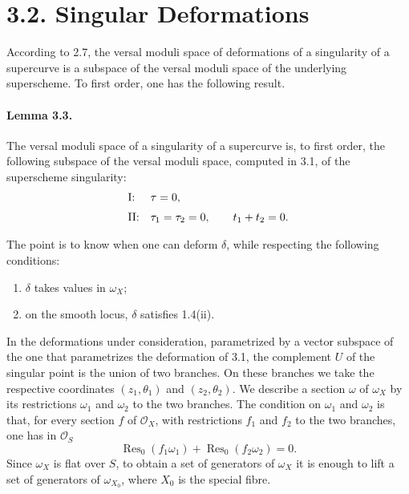 \documentclass[11pt]{article}
\newcommand{\OO}{\mathcal O}
\newcommand{\res}{\operatorname{Res}}
\begin{document}
\section*{3.2. Singular Deformations}

According to 2.7, the versal moduli space of deformations of a singularity of a supercurve is a subspace of the versal moduli space of the underlying superscheme. To first order, one has the following result.

\paragraph{Lemma 3.3.}
The versal moduli space of a singularity of a supercurve is, to first order, the following subspace of the versal moduli space, computed in 3.1, of the superscheme singularity:
\[
\begin{array}{ll}
\text{\rm I:} & \tau=0,\\[2mm]
\text{\rm II:} & \tau_1=\tau_2=0,\qquad t_1+t_2=0 .
\end{array}
\]

The point is to know when one can deform $\delta$, while respecting the following conditions:
\begin{enumerate}
\item[(a)] $\delta$ takes values in $\omega_X$;
\item[(b)] on the smooth locus, $\delta$ satisfies 1.4(ii).
\end{enumerate}

In the deformations under consideration, parametrized by a vector subspace of the one that parametrizes the deformation of 3.1, the complement $U$ of the singular point is the union of two branches. On these branches we take the respective coordinates $(z_1,\theta_1)$ and $(z_2,\theta_2)$. We describe a section $\omega$ of $\omega_X$ by its restrictions $\omega_1$ and $\omega_2$ to the two branches. The condition on $\omega_1$ and $\omega_2$ is that, for every section $f$ of $\OO_X$, with restrictions $f_1$ and $f_2$ to the two branches, one has in $\OO_S$
\[
  \res_0(f_1\omega_1)+\res_0(f_2\omega_2)=0 .
\]
Since $\omega_X$ is flat over $S$, to obtain a set of generators of $\omega_X$ it is enough to lift a set of generators of $\omega_{X_0}$, where $X_0$ is the special fibre.
\end{document}
